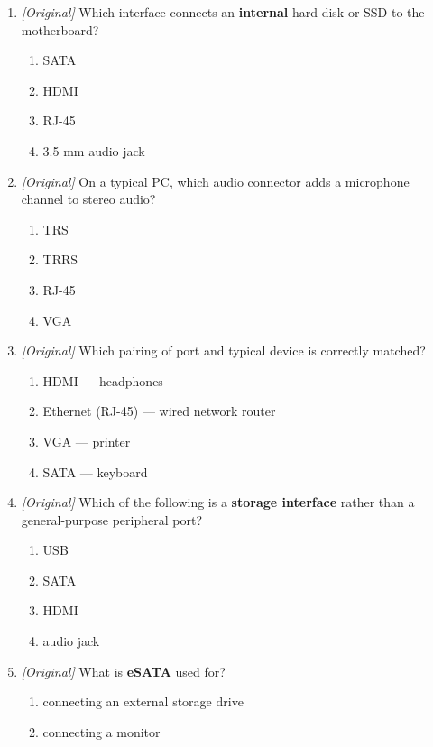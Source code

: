 \begin{enumerate}[label=\textbf{Q\arabic*.}, leftmargin=*]
\begin{enumerate}[label=\Alph*.]
    \item fragmentation
    \item multiplexing
  \end{enumerate}
\item \textit{[Original]} Which interface connects an \textbf{internal} hard
  disk or SSD to the motherboard?
  \begin{enumerate}[label=\Alph*.]
    \item SATA
    \item HDMI
    \item RJ-45
    \item 3.5 mm audio jack
  \end{enumerate}
\item \textit{[Original]} On a typical PC, which audio connector adds a
  microphone channel to stereo audio?
  \begin{enumerate}[label=\Alph*.]
    \item TRS
    \item TRRS
    \item RJ-45
    \item VGA
  \end{enumerate}
\item \textit{[Original]} Which pairing of port and typical device is
  correctly matched?
  \begin{enumerate}[label=\Alph*.]
    \item HDMI --- headphones
    \item Ethernet (RJ-45) --- wired network router
    \item VGA --- printer
    \item SATA --- keyboard
  \end{enumerate}
\item \textit{[Original]} Which of the following is a \textbf{storage
  interface} rather than a general-purpose peripheral port?
  \begin{enumerate}[label=\Alph*.]
    \item USB
    \item SATA
    \item HDMI
    \item audio jack
  \end{enumerate}
\item \textit{[Original]} What is \textbf{eSATA} used for?
  \begin{enumerate}[label=\Alph*.]
    \item connecting an external storage drive
    \item connecting a monitor

\end{enumerate}
\end{enumerate}
